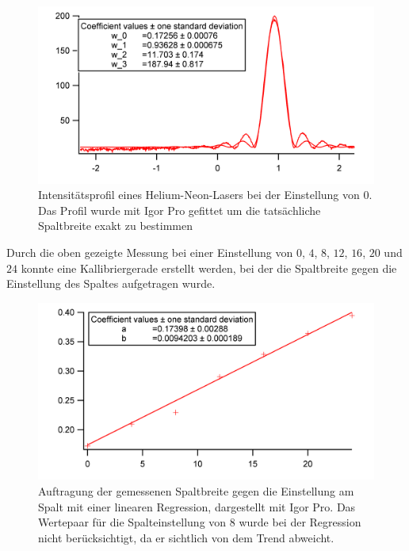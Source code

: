 \begin{figure}[H]
	\centering	
	\begin{minipage}{1\textwidth}
		\includegraphics[width=\columnwidth]{180618/GraphSB0.png}
	\end{minipage}
	\caption{Intensitätsprofil eines Helium-Neon-Lasers bei der Einstellung von $0$. Das Profil wurde mit Igor Pro gefittet um die tatsächliche Spaltbreite exakt zu bestimmen }
	\label{HeNe_0_Prof}
\end{figure}

Durch die oben gezeigte Messung bei einer Einstellung von $0$, $4$, $8$, $12$, $16$, $20$ und $24$ konnte eine Kallibriergerade erstellt werden, bei der die Spaltbreite gegen die Einstellung des Spaltes aufgetragen wurde.

\begin{figure}[H]
	\centering	
	\begin{minipage}{1\textwidth}
		\includegraphics[width=\columnwidth]{180618/Graph_kal.png}
	\end{minipage}
	\caption{Auftragung der gemessenen Spaltbreite gegen die Einstellung am Spalt mit einer linearen Regression, dargestellt mit Igor Pro. Das Wertepaar für die Spalteinstellung von $8$ wurde bei der Regression nicht berücksichtigt, da er sichtlich von dem Trend abweicht.}
	\label{HeNe_0_Prof}
\end{figure}

